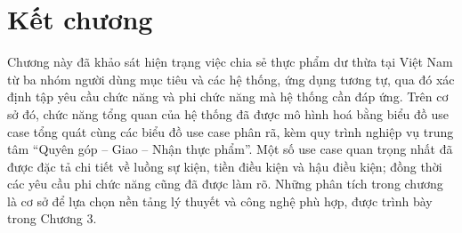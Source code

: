 \documentclass[../main.tex]{subfiles}%
\begin{document}
\section{Kết chương}
\label{section:2.6}
Chương này đã khảo sát hiện trạng việc chia sẻ thực phẩm dư thừa tại Việt Nam từ ba nhóm người dùng mục tiêu và các hệ thống, ứng dụng tương tự, qua đó xác định tập yêu cầu chức năng và phi chức năng mà hệ thống cần đáp ứng. Trên cơ sở đó, chức năng tổng quan của hệ thống đã được mô hình hoá bằng biểu đồ use case tổng quát cùng các biểu đồ use case phân rã, kèm quy trình nghiệp vụ trung tâm ``Quyên góp -- Giao -- Nhận thực phẩm''. Một số use case quan trọng nhất đã được đặc tả chi tiết về luồng sự kiện, tiền điều kiện và hậu điều kiện; đồng thời các yêu cầu phi chức năng cũng đã được làm rõ. Những phân tích trong chương là cơ sở để lựa chọn nền tảng lý thuyết và công nghệ phù hợp, được trình bày trong Chương 3.

\ifSubfilesClassLoaded{\printbibliography{}}{}
\end{document}
